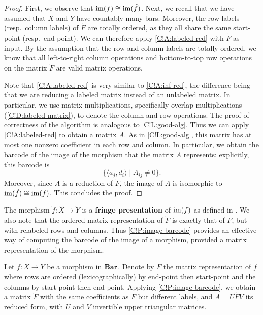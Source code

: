 \begin{proof}
  First, we observe that $\im(f) \cong \im(\tilde{f})$. Next, we recall that we have assumed that $X$ and $Y$ have countably many bars. Moreover, the row labels (resp.\ column labels) of $\tilde{F}$ are totally ordered, as they all share the same start-point (resp.\ end-point). We can therefore apply \cref{C!A:labeled-red} with $\tilde{F}$ as input. By the assumption that the row and column labels are totally ordered, we know that all left-to-right column operations and bottom-to-top row operations on the matrix $\tilde{F}$ are valid matrix operations.

  Note that \cref{C!A:labeled-red} is very similar to \cref{C!A:inf-red}, the difference being that we are reducing a labeled matrix instead of an unlabeled matrix. In particular, we use matrix multiplications, specifically overlap multiplications (\cref{C!D:labeled-matrix}), to denote the column and row operations. The proof of correctness of the algorithm is analogous to \cref{C!L:good-alg}. Thus we can apply \cref{C!A:labeled-red} to obtain a matrix $A$. As in \cref{C!L:good-alg}, this matrix has at most one nonzero coefficient in each row and column. In particular, we obtain the barcode of the image of the morphism that the matrix $A$ represents: explicitly, this barcode is
  \[
    \{ \langle a_j, d_i \rangle \mid A_{ij} \neq 0 \}.
  \]
  Moreover, since $A$ is a reduction of $\tilde{F}$, the image of $A$ is isomorphic to $\im(\tilde{f}) \cong \im(f)$. This concludes the proof.
\end{proof}

\begin{remark}
  The morphism $\tilde{f} \colon \tilde{X} \to \tilde{Y}$ is a \textbf{fringe presentation} of $\im(f)$ as defined in \cite{Miller2025}. We also note that the ordered matrix representation of $\tilde{F}$ is exactly that of $F$, but with relabeled rows and columns. Thus \cref{C!P:image-barcode} provides an effective way of computing the barcode of the image of a morphism, provided a matrix representation of the morphism.
\end{remark}

Let $f \colon X \to Y$ be a morphism in $\Bar$. Denote by $F$ the matrix representation of $f$ where rows are ordered (lexicographically) by end-point then start-point and the columns by start-point then end-point. Applying \cref{C!P:image-barcode}, we obtain a matrix $\tilde{F}$ with the same coefficients as $F$ but different labels, and $A = U \tilde{F} V$ its reduced form, with $U$ and $V$ invertible upper triangular matrices.


